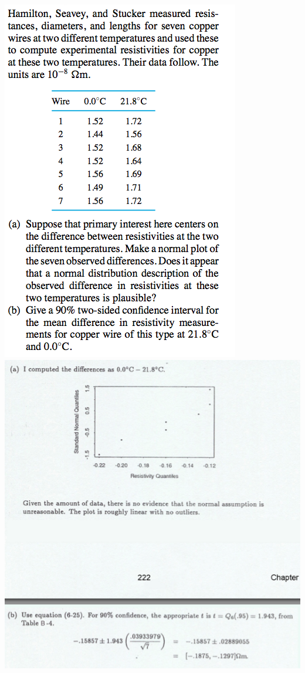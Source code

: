 \documentclass{article}\usepackage{graphicx, color}
\numberwithin{equation}{section}
\begin{document}
\begin{flushleft}
\begin{enumerate}[1. ]
 \includegraphics{../../fig/finalreviewp3.png}
 \includegraphics{../../fig/finalreviewp3sol.png}


\end{enumerate}
\end{flushleft}
\end{document}
